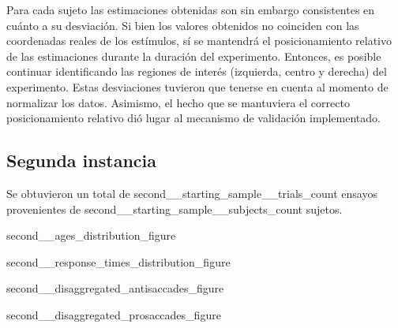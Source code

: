 Para cada sujeto las estimaciones obtenidas son sin embargo consistentes en
cuánto a su desviación. Si bien los valores obtenidos no coinciden con las
coordenadas reales de los estímulos, sí se mantendrá el posicionamiento
relativo de las estimaciones durante la duración del experimento. Entonces, es
posible continuar identificando las regiones de interés (izquierda, centro y
derecha) del experimento. Estas desviaciones tuvieron que tenerse en cuenta al
momento de normalizar los datos. Asimismo, el hecho que se mantuviera el
correcto posicionamiento relativo dió lugar al mecanismo de validación
implementado.


\subsection{{Segunda instancia}}

Se obtuvieron un total de {second__starting_sample__trials_count} ensayos
provenientes de {second__starting_sample__subjects_count} sujetos.


{second__ages_distribution_figure}

{second__response_times_distribution_figure}

{second__disaggregated_antisaccades_figure}

{second__disaggregated_prosaccades_figure}
